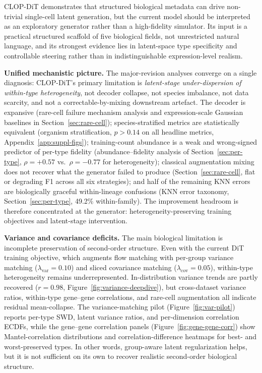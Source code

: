 \documentclass[11pt,a4paper]{article}
\begin{document}
CLOP-DiT demonstrates that structured biological metadata can drive non-trivial single-cell latent generation, but the current model should be interpreted as an exploratory generator rather than a high-fidelity simulator. Its input is a practical structured scaffold of five biological fields, not unrestricted natural language, and its strongest evidence lies in latent-space type specificity and controllable steering rather than in indistinguishable expression-level realism.

\textbf{Unified mechanistic picture.} The major-revision analyses converge on a single diagnosis: CLOP-DiT's primary limitation is \emph{latent-stage under-dispersion of within-type heterogeneity}, not decoder collapse, not species imbalance, not data scarcity, and not a correctable-by-mixing downstream artefact. The decoder is expansive (rare-cell failure mechanism analysis and expression-scale Gaussian baselines in Section~\ref{sec:rare-cell}); species-stratified metrics are statistically equivalent (organism stratification, $p > 0.14$ on all headline metrics, Appendix~\ref{app:suppl-figs}); training-count abundance is a weak and wrong-signed predictor of per-type fidelity (abundance--fidelity analysis of Section~\ref{sec:per-type}, $\rho = +0.57$ vs.\ $\rho = -0.77$ for heterogeneity); classical augmentation mixing does not recover what the generator failed to produce (Section~\ref{sec:rare-cell}, flat or degrading F1 across all six strategies); and half of the remaining KNN errors are biologically graceful within-lineage confusions (KNN error taxonomy, Section~\ref{sec:per-type}, 49.2\% within-family). The improvement headroom is therefore concentrated at the generator: heterogeneity-preserving training objectives and latent-stage intervention.

\textbf{Variance and covariance deficits.} The main biological limitation is incomplete preservation of second-order structure. Even with the current DiT training objective, which augments flow matching with per-group variance matching ($\lambda_\text{var}=0.10$) and sliced covariance matching ($\lambda_\text{cov}=0.05$), within-type heterogeneity remains underrepresented. In-distribution variance trends are partly recovered ($r = 0.98$, Figure~\ref{fig:variance-deepdive}), but cross-dataset variance ratios, within-type gene--gene correlations, and rare-cell augmentation all indicate residual mean-collapse. The variance-matching pilot (Figure~\ref{fig:var-pilot}) reports per-type SWD, latent variance ratios, and per-dimension correlation ECDFs, while the gene--gene correlation panels (Figure~\ref{fig:gene-gene-corr}) show Mantel-correlation distributions and correlation-difference heatmaps for best- and worst-preserved types. In other words, group-aware latent regularization helps, but it is not sufficient on its own to recover realistic second-order biological structure.
\end{document}
